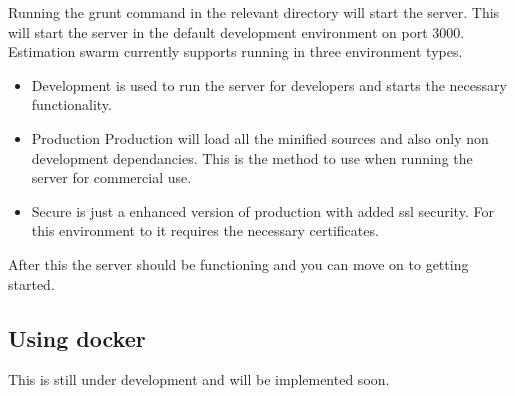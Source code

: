 \newline
Running the grunt command in the relevant directory will start the server. This will start the server in the default development environment on port 3000. Estimation swarm currently supports running in three environment types.
\begin{itemize}
	\item{Development} is used to run the server for developers and starts the necessary functionality.
	\item{Production}
	Production will load all the minified sources and also only non development dependancies. This is the method to use when running the server for commercial use.
	\item{Secure} is just a enhanced version of production with added ssl security. For this environment to it requires the necessary certificates.
\end{itemize}
After this the server should be functioning and you can move on to getting started.
\subsection{Using docker}
This is still under development and will be implemented soon.